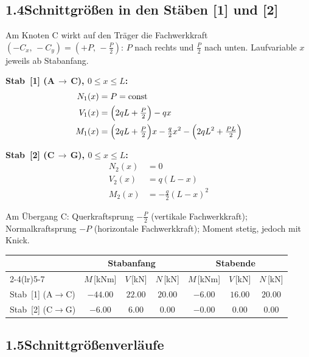 \documentclass[a4paper,11pt]{article}
\begin{document}
\subsection*{1.4\quad Schnittgrößen in den Stäben [1] und [2]}

Am Knoten C wirkt auf den Träger die Fachwerkkraft
$(-C_x,\,-C_y) = (+P,\,-\tfrac{P}{2})$:
$P$ nach rechts und $\tfrac{P}{2}$ nach unten.
Laufvariable $x$ jeweils ab Stabanfang.

\textbf{Stab~[1] (A\,$\to$\,C), $0 \le x \le L$:}
\begin{align*}
  N_1(x) &= P = \text{const} \\
  V_1(x) &= \Bigl(2qL + \tfrac{P}{2}\Bigr) - qx \\
  M_1(x) &= \Bigl(2qL + \tfrac{P}{2}\Bigr)x - \tfrac{q}{2}x^2
            - \Bigl(2qL^2 + \tfrac{PL}{2}\Bigr)
\end{align*}

\textbf{Stab~[2] (C\,$\to$\,G), $0 \le x \le L$:}
\begin{align*}
  N_2(x) &= 0 \\
  V_2(x) &= q(L - x) \\
  M_2(x) &= -\tfrac{q}{2}(L - x)^2
\end{align*}

Am Übergang C: Querkraftsprung $-\tfrac{P}{2}$ (vertikale Fachwerkkraft);
Normalkraftsprung $-P$ (horizontale Fachwerkkraft); Moment stetig, jedoch mit Knick.

\medskip
\begin{center}
\begin{tabular}{l cccccc}
\toprule
 & \multicolumn{3}{c}{\textbf{Stabanfang}} & \multicolumn{3}{c}{\textbf{Stabende}} \\
\cmidrule(lr){2-4}\cmidrule(lr){5-7}
 & $M$\,[kNm] & $V$\,[kN] & $N$\,[kN]
 & $M$\,[kNm] & $V$\,[kN] & $N$\,[kN] \\
\midrule
Stab~[1] (A$\to$C) & $-44.00$ & $22.00$ & $20.00$ & $-6.00$ & $16.00$ & $20.00$ \\[3pt]
Stab~[2] (C$\to$G) & $-6.00$ & $6.00$ & $0.00$ & $-0.00$ & $0.00$ & $0.00$ \\
\bottomrule
\end{tabular}
\end{center}

\subsection*{1.5\quad Schnittgrößenverläufe}


\end{document}
